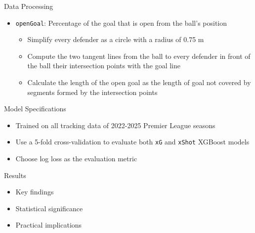 \documentclass[
  11pt,
  ignorenonframetext,
]{beamer}
\providecommand{\tightlist}{%
  \setlength{\itemsep}{0pt}\setlength{\parskip}{0pt}}
\begin{document}
\begin{frame}[fragile]{Data Processing}
\protect{}\label{data-processing-2}
\begin{itemize}
\tightlist
\item
  \texttt{openGoal}: Percentage of the goal that is open from the ball's
  position

  \begin{itemize}
  \tightlist
  \item
    Simplify every defender as a circle with a radius of 0.75 m
  \item
    Compute the two tangent lines from the ball to every defender in
    front of the ball their intersection points with the goal line
  \item
    Calculate the length of the open goal as the length of goal not
    covered by segments formed by the intersection points
  \end{itemize}
\end{itemize}
\end{frame}

\begin{frame}[fragile]{Model Specifications}
\protect{}\label{model-specifications}
\begin{itemize}
\tightlist
\item
  Trained on all tracking data of 2022-2025 Premier League seasons
\item
  Use a 5-fold cross-validation to evaluate both \texttt{xG} and
  \texttt{xShot} XGBoost models
\item
  Choose log loss as the evaluation metric
\end{itemize}
\end{frame}

\begin{frame}{Results}
\protect{}\label{results}
\begin{itemize}
\tightlist
\item
  Key findings
\item
  Statistical significance
\item
  Practical implications
\end{itemize}
\end{frame}
\end{document}
